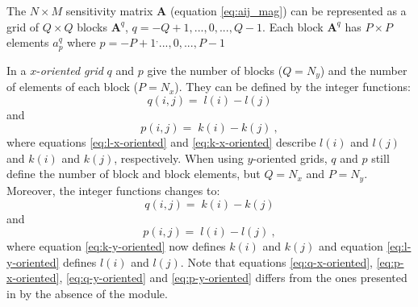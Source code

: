 The $N \times M$ sensitivity matrix  $\mathbf{A}$ (equation \ref{eq:aij_mag}) can be represented as a grid of $Q \times Q$ blocks $\mathbf{A}^q$, $q = -Q+1,...,0,..., Q-1$. Each block  $\mathbf{A}^q$ has $P \times P$ elements $a^{q}_p$ where $p = -P+1^,...,0,...,P-1$

In a $x$-\textit{oriented grid} $q$ and $p$ give the number of blocks ($Q = N_{y}$) and the number of elements of each block ($P = N_{x}$). They can be defined by the integer functions:
\begin{equation}
q(i, j) = \; l(i) - l(j)
\label{eq:q-x-oriented}
\end{equation}
and
\begin{equation}
p(i, j) = \; k(i) - k(j) \: ,
\label{eq:p-x-oriented}
\end{equation}
where equations \ref{eq:l-x-oriented} and \ref{eq:k-x-oriented} describe $l(i)$ and $l(j)$ and $k(i)$ and $k(j)$, respectively. When using $y$-oriented grids, $q$ and $p$ still define the number of block and block elements, but $Q = N_{x}$ and $P = N_{y}$. Moreover, the integer functions changes to:
\begin{equation}
q(i, j) = \; k(i) - k(j) 
\label{eq:q-y-oriented}
\end{equation}
and
\begin{equation}
p(i, j) = \; l(i) - l(j) \: ,
\label{eq:p-y-oriented}
\end{equation}
where equation \ref{eq:k-y-oriented} now defines $k(i)$ and $k(j)$ and equation \ref{eq:l-y-oriented} defines $l(i)$ and $l(j)$. Note that equations \ref{eq:q-x-oriented}, \ref{eq:p-x-oriented}, \ref{eq:q-y-oriented} and \ref{eq:p-y-oriented} differs from the ones presented in \cite{takahashi2020convolutional} by the absence of the module.

